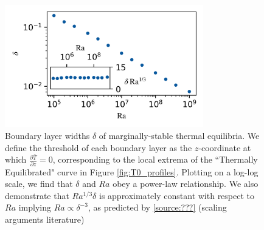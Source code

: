 \documentclass[reprint,amsmath,amssymb,aps]{revtex4-1}
\begin{document}
\begin{figure}[h]
    \centering
    \includegraphics[width=3.4in]{del_ra.PNG}
    \caption{Boundary layer widths $\delta$ of marginally-stable thermal equilibria. We define the threshold of each boundary layer as the $z$-coordinate at which $\frac{\partial \bar{T}}{\partial z} = 0$, corresponding to the local extrema of the ``Thermally Equilibrated" curve in Figure \ref{fig:T0_profiles}. Plotting on a log-log scale, we find that $\delta$ and $Ra$ obey a power-law relationship. We also demonstrate that $Ra^{1/3}\delta$ is approximately constant with respect to $Ra$ implying $Ra \propto  \delta^{-3}$, as predicted by \ref{source:???} (scaling arguments literature)}
    \label{fig:bl_ra}
\end{figure}
\end{document}
